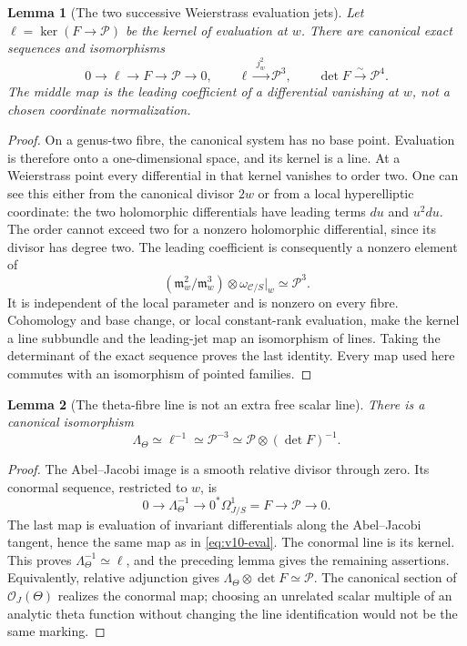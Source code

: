 \documentclass[11pt]{article}
\newtheorem{lemma}[lemma]{Lemma}
\theoremstyle{definition}
\theoremstyle{remark}
\begin{document}
\begin{lemma}[The two successive Weierstrass evaluation jets]
\label{lem:v10-eval}
Let $\ell=\ker(F\to\mathscr P)$ be the kernel of evaluation at $w$.
There are canonical exact sequences and isomorphisms
\begin{equation}
 0\longrightarrow\ell\longrightarrow F\longrightarrow\mathscr P
 \longrightarrow0,\qquad
 \ell\xrightarrow{\;j^2_w\;}\mathscr P^3,\qquad
 \det F\xrightarrow{\sim}\mathscr P^4.
 \label{eq:v10-eval}
\end{equation}
The middle map is the leading coefficient of a differential vanishing at
$w$, not a chosen coordinate normalization.
\end{lemma}
\begin{proof}
On a genus-two fibre, the canonical system has no base point. Evaluation
is therefore onto a one-dimensional space, and its kernel is a line.
At a Weierstrass point every differential in that kernel vanishes to
order two. One can see this either from the canonical divisor $2w$ or
from a local hyperelliptic coordinate: the two holomorphic differentials
have leading terms $du$ and $u^2du$. The order cannot exceed two for a
nonzero holomorphic differential, since its divisor has degree two.
The leading coefficient is consequently a nonzero element of
\[
 (\mathfrak m_w^2/\mathfrak m_w^3)\otimes
 \omega_{\mathcal C/S}|_w\simeq\mathscr P^3.
\]
It is independent of the local parameter and is nonzero on every fibre.
Cohomology and base change, or local constant-rank evaluation, make the
kernel a line subbundle and the leading-jet map an isomorphism of lines.
Taking the determinant of the exact sequence proves the last identity.
Every map used here commutes with an isomorphism of pointed families.
\end{proof}

\begin{lemma}[The theta-fibre line is not an extra free scalar line]
\label{lem:v10-adjunction}
There is a canonical isomorphism
\begin{equation}
 \boxed{\Lambda_\Theta\simeq\ell^{-1}
 \simeq\mathscr P^{-3}
 \simeq\mathscr P\otimes(\det F)^{-1}.}
 \label{eq:v10-adjunction}
\end{equation}
\end{lemma}
\begin{proof}
The Abel--Jacobi image is a smooth relative divisor through zero. Its
conormal sequence, restricted to $w$, is
\[
 0\longrightarrow\Lambda_\Theta^{-1}
 \longrightarrow 0^*\Omega^1_{J/S}=F
 \longrightarrow\mathscr P\longrightarrow0.
\]
The last map is evaluation of invariant differentials along the
Abel--Jacobi tangent, hence the same map as in \cref{eq:v10-eval}.
The conormal line is its kernel. This proves
$\Lambda_\Theta^{-1}\simeq\ell$, and the preceding lemma gives the
remaining assertions. Equivalently, relative adjunction gives
$\Lambda_\Theta\otimes\det F\simeq\mathscr P$.
The canonical section of $\mathcal O_J(\Theta)$ realizes the conormal
map; choosing an unrelated scalar multiple of an analytic theta function
without changing the line identification would not be the same marking.
\end{proof}
\end{document}
